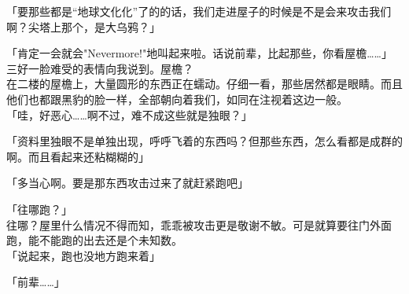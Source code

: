 「要那些都是“地球文化化”了的的话，我们走进屋子的时候是不是会来攻击我们啊？尖塔上那个，是大乌鸦？」

「肯定一会就会"Nevermore!"地叫起来啦。话说前辈，比起那些，你看屋檐……」\\

三好一脸难受的表情向我说到。屋檐？\\

在二楼的屋檐上，大量圆形的东西正在蠕动。仔细一看，那些居然都是眼睛。而且他们也都跟黑豹的脸一样，全部朝向着我们，如同在注视着这边一般。\\

「哇，好恶心……啊不过，难不成这些就是独眼？」

「资料里独眼不是单独出现，呼呼飞着的东西吗？但那些东西，怎么看都是成群的啊。而且看起来还粘糊糊的」

「多当心啊。要是那东西攻击过来了就赶紧跑吧」

「往哪跑？」\\

往哪？屋里什么情况不得而知，乖乖被攻击更是敬谢不敏。可是就算要往门外面跑，能不能跑的出去还是个未知数。\\

「说起来，跑也没地方跑来着」

「前辈……」\\

